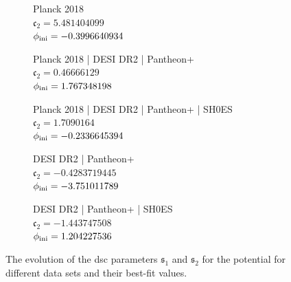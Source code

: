 
\begin{figure}[htbp]
	\centering

	\begin{subfigure}[t]{0.49\textwidth}
		\centering
		\resizebox{\linewidth}{!}{%
		}
		\caption{Planck 2018\\$\mathfrak{c}_2 = 5.481404099$\\$\phi_{\textnormal{ini}} = -0.3996640934$}
		\label{fig:HyperbolicdSC:Planck}
	\end{subfigure}
	\hfill
	\begin{subfigure}[t]{0.49\textwidth}
		\centering
		\resizebox{\linewidth}{!}{%
		}
		\caption{Planck 2018 | DESI DR2 | Pantheon+\\$\mathfrak{c}_2 = 0.46666129$\\$\phi_{\textnormal{ini}} = 1.767348198$}
		\label{fig:HyperbolicdSC:PlanckPPDESI}
	\end{subfigure}

	\vspace{0.35em}

	\begin{subfigure}[t]{0.49\textwidth}
		\centering
		\resizebox{\linewidth}{!}{%
		}
		\caption{Planck 2018 | DESI DR2 | Pantheon+ | SH0ES\\$\mathfrak{c}_2 = 1.7090164$\\$\phi_{\textnormal{ini}} = -0.2336645394$}
		\label{fig:HyperbolicdSC:PlanckPPSDESI}
	\end{subfigure}
	\hfill
	\begin{subfigure}[t]{0.49\textwidth}
		\centering
		\resizebox{\linewidth}{!}{%
		}
		\caption{DESI DR2 | Pantheon+\\$\mathfrak{c}_2 = -0.4283719445$\\$\phi_{\textnormal{ini}} = -3.751011789$}
		\label{fig:HyperbolicdSC:PPD}
	\end{subfigure}

	\vspace{0.35em}

	\hspace*{\fill}
	\begin{subfigure}[t]{0.49\textwidth}
		\centering
		\resizebox{\linewidth}{!}{%
		}
		\caption{DESI DR2 | Pantheon+ | SH0ES\\$\mathfrak{c}_2 = -1.443747508$\\$\phi_{\textnormal{ini}} = 1.204227536$}
		\label{fig:HyperbolicdSC:PPSD}
	\end{subfigure}
	\hspace*{\fill}

	\tagstructend
	\caption[De Sitter Conjecture parameter evolution.]{The evolution of the \gls{dsc} parameters $\mathfrak{s}_1$ and $\mathfrak{s}_2$ for the  potential for different data sets and their best-fit values.}
	\label{fig:HyperbolicdSC}
\end{figure}
